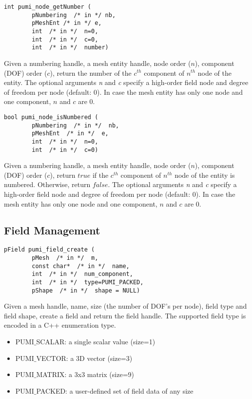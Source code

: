 \begin{verbatim} 
int pumi_node_getNumber (
        pNumbering  /* in */ nb, 
        pMeshEnt /* in */ e,
        int  /* in */  n=0,
        int  /* in */  c=0,
        int  /* in */  number)
\end{verbatim}\vspace{-.5cm}\hspace{1cm}
Given a numbering handle, a mesh entity handle, node order ($n$), component (DOF) order ($c$), return the number of the $c^{th}$ component of $n^{th}$ node of the entity. The  optional arguments \emph{n} and \emph{c} specify a high-order field node and degree of freedom per node (default: $0$). In case the mesh entity has only one node and one component, $n$ and $c$ are $0$.

\begin{verbatim} 
bool pumi_node_isNumbered (
        pNumbering  /* in */  nb, 
        pMeshEnt  /* in */  e,
        int  /* in */  n=0,
        int  /* in */  c=0)
\end{verbatim}\vspace{-.5cm}\hspace{1cm}
Given a numbering handle, a mesh entity handle, node order ($n$), component (DOF) order ($c$), return $true$ if the $c^{th}$ component of $n^{th}$ node of the entity is numbered. Otherwise, return $false$. The  optional arguments \emph{n} and \emph{c} specify a high-order field node and degree of freedom per node (default: $0$). In case the mesh entity has only one node and one component, $n$ and $c$ are $0$.


\subsection{Field Management}

\begin{verbatim}
pField pumi_field_create (
        pMesh  /* in */  m, 
        const char*  /* in */  name,
        int  /* in */  num_component, 
        int  /* in */  type=PUMI_PACKED, 
        pShape  /* in */  shape = NULL)
\end{verbatim}\vspace{-.5cm}\hspace{1cm}
Given a mesh handle, name, size (the number of DOF's per node), field type and field shape, create a field and return the field handle. The supported field type is encoded in a C++ enumeration type.

\begin{itemize}
\item PUMI$\_$SCALAR: a single scalar value (size=1)
\item PUMI$\_$VECTOR: a 3D vector (size=3)
\item PUMI$\_$MATRIX: a 3x3 matrix (size=9)
\item PUMI$\_$PACKED: a user-defined set of field data of any size
\end{itemize}

